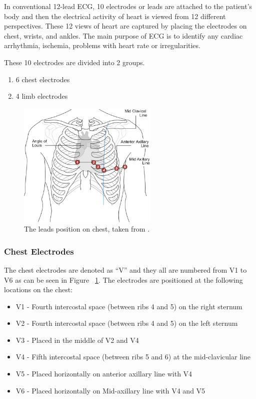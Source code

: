 In conventional 12-lead ECG, 10 electrodes or leads  are attached to the patient's body and then the electrical activity of heart is viewed from 12 different perspectives. These 12 views of heart are captured by placing the electrodes on chest, wrists, and ankles. The main purpose of ECG is to identify any cardiac arrhythmia, ischemia, problems with heart rate or irregularities.

These 10 electrodes are divided into 2 groups. 
\begin{enumerate}
	\item 6 chest electrodes
	\item 4 limb electrodes
\end{enumerate}

\begin{figure}[htpb]
	\centering
	\includegraphics[width=\textwidth,height=6cm,keepaspectratio=true]{images/6_lead_placement}
	\caption{
		The leads position on chest, taken from \cite{TUON:six_leads}.
	}
	\label{fig:6_lead_placement}
\end{figure}


\subsubsection{Chest Electrodes}
The chest electrodes are denoted as ``V'' and they all are numbered from V1 to V6 as can be seen in Figure ~\ref{fig:6_lead_placement}. The electrodes are positioned at the following locations on the chest:

\begin{itemize}
	\item V1 - Fourth intercostal space (between ribs 4 and 5) on the right sternum
	\item V2 - Fourth intercostal space (between ribs 4 and 5) on the left sternum
	\item V3 - Placed in the middle of V2 and V4
	\item V4 - Fifth intercostal space (between ribs 5 and 6) at the mid-clavicular line
	\item V5 - Placed horizontally on anterior axillary line with V4
	\item V6 - Placed horizontally on Mid-axillary line with V4 and V5
\end{itemize} 



